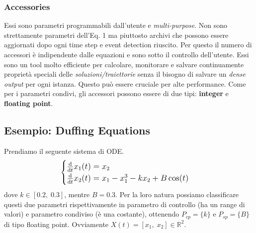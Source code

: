 \documentclass[11pt]{article}
\begin{document}
\subsubsection*{Accessories}
Essi sono parametri programmabili dall'utente e \textit{multi-purpose}. Non sono strettamente parametri dell'Eq. 1 ma piuttosto archivi che possono essere aggiornati dopo ogni time step e event detection riuscito. Per questo il numero di accessori è indipendente dalle equazioni e sono sotto il controllo dell'utente. Essi sono un tool molto efficiente per calcolare, monitorare e salvare continuamente proprietà speciali delle \textit{soluzioni/traiettorie} senza il bisogno di salvare un \textit{dense output} per ogni istanza. Questo può essere cruciale per alte performance. Come per i parametri condivi, gli accessori possono essere di due tipi: \textbf{integer} e \textbf{floating point}.
\subsection{Esempio: Duffing Equations}
Prendiamo il seguente sistema di ODE.
\begin{equation}
    {\large
        \begin{cases}
            \frac{\mathrm{d}}{\mathrm{d}t}x_1(t) = x_2\\
            \frac{\mathrm{d}}{\mathrm{d}t}x_2(t) = x_1 - x_1^3 - kx_2 + B\cos(t)
        \end{cases}
    }
\end{equation}
dove $k \in [0.2,\;0.3]$, mentre $B = 0.3$. Per la loro natura possiamo classificare questi due parametri rispettivamente in parametro di controllo (ha un range di valori) e parametro condiviso (è una costante), ottenendo $P_{cp} = \{k\}$ e $P_{sp} = \{B\}$ di tipo floating point. Ovviamente $X(t) = [x_1, \;x_2] \in \mathbb{R}^2$.
\end{document}
